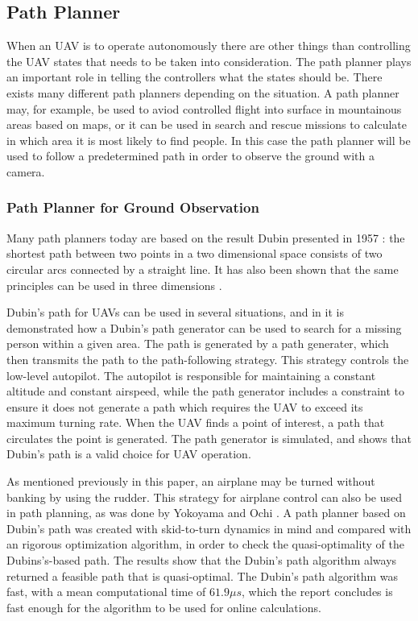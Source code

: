 \subsection{Path Planner}
When an UAV is to operate autonomously there are other things than controlling the UAV states that needs to be taken into consideration. The path planner plays an important role in telling the controllers what the states should be. There exists many different path planners depending on the situation. A path planner may, for example, be used to aviod controlled flight into surface in mountainous areas based on maps, or it can be used in search and rescue missions to calculate in which area it is most likely to find people. In this case the path planner will be used to follow a predetermined path in order to observe the ground with a camera.


\subsubsection{Path Planner for Ground Observation}
Many path planners today are based on the result Dubin presented in 1957 \cite{DUBIN}: the shortest path between two points in a two dimensional space consists of two circular arcs connected by a straight line. It has also been shown that the same principles can be used in three dimensions \cite{dubinsBEARD}. 

Dubin's path for UAVs can be used in several situations, and in \cite{dubinFixedWingLUGO} it is demonstrated how a Dubin's path generator can be used to search for a missing person within a given area. The path is generated by a path generater, which then transmits the path to the path-following strategy. This strategy controls the low-level autopilot. The autopilot is responsible for maintaining a constant altitude and constant airspeed, while the path generator includes a constraint to ensure it does not generate a path which requires the UAV to exceed its maximum turning rate. When the UAV finds a point of interest, a path that circulates the point is generated. The path generator is simulated, and shows that Dubin's path is a valid choice for UAV operation.

As mentioned previously in this paper, an airplane may be turned without banking by using the rudder. This strategy for airplane control can also be used in path planning, as was done by Yokoyama and Ochi \cite{skidPathYOKO}. A path planner based on Dubin's path was created with skid-to-turn dynamics in mind and compared with an rigorous optimization algorithm, in order to check the quasi-optimality of the Dubins's-based path. The results show that the Dubin's path algorithm always returned a feasible path that is quasi-optimal. The Dubin's path algorithm was fast, with a mean computational time of $61.9\mu s$, which the report concludes is fast enough for the algorithm to be used for online calculations.


